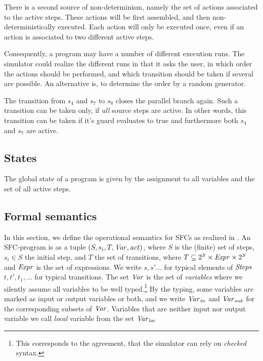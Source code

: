 There is a second source of non-determinism, namely the set of actions
associated to the active steps.  These actions will be first assembled, and
then non-deterministically executed.  Each action will only be executed once,
even if an action is associated to two different active steps.

Consequently, a program may have a number of different execution runs.  The
simulator could realize the different runs in that it asks the user, in which
order the actions should be performed, and which transition should be taken if
several are possible.  An alternative is, to determine the order by a random
generator.

The transition from $s_4$ and $s_7$ to $s_8$ closes the parallel branch again.
Such a transition can be taken only, if \emph{all} source steps are active. In
other words, this transition can be taken if it's guard evaluates to true and
furthermore both $s_4$ and $s_7$ are active.



\subsection{States}
\label{sec:states}

The global state of a program is given by the assignment to all variables and
the set of all active steps.


\subsection{Formal semantics}

In this section, we define the operational semantics for SFCs as realized
in \Slime. An SFC-program is as a tuple $(S,s_i,T,\mathit{Var},\mathit{act})$, where $S$ is
the (finite) set of steps, $s_i \in S$ the initial step, and $T$ the set of
transitions, where $T \subseteq 2^S \times \mathit{Expr} \times 2^S$ and $\mathit{Expr}$ is
the set of expressions. We write $s, s' \ldots$ for typical elements of
$\mathit{Steps}$ $t,t', t_1, \ldots$ for typical transitions. The set $\mathit{Var}$ is the
set of \emph{variables} where we silently assume all variables to be well
typed.\footnote{This corresponds to the agreement, that the simulator can
  rely on \emph{checked} syntax.}  By the typing, some variables are marked
as input or output variables or both, and we write $\mathit{Var}_{\mathit{in}}$ and $\mathit{Var}_{\mathit{out}}$
for the corresponding subsets of $\mathit{Var}$. Variables that are neither input
nor output variable we call \emph{local} variable from the set $\mathit{Var}_{\mathit{loc}}$


